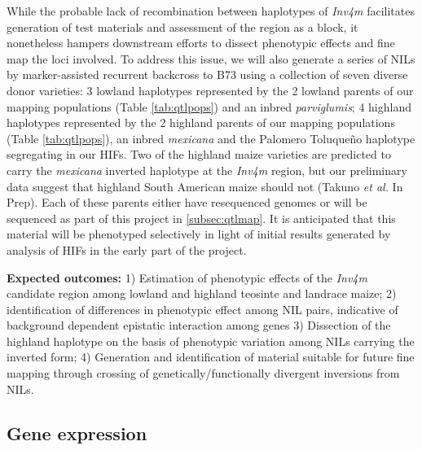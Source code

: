 While the probable lack of recombination between haplotypes of \emph{Inv4m} \citep{Pyhajarvi2013} facilitates generation of test materials and assessment of the region as a block, it nonetheless hampers downstream efforts to dissect phenotypic effects and fine map the loci involved. To address this issue, we will also generate a series of NILs by marker-assisted recurrent backcross to B73 using a collection of seven diverse donor varieties: 3 lowland haplotypes represented by the 2 lowland parents of our mapping populations (Table \ref{tab:qtlpops}) and an inbred \emph{parviglumis}; 4 highland haplotypes represented by the 2 highland parents of our mapping populations (Table \ref{tab:qtlpops}), an inbred \emph{mexicana} and the Palomero Toluque\~no haplotype segregating in our HIFs. Two of the highland maize varieties are predicted to carry the \emph{mexicana} inverted haplotype at the \emph{Inv4m} region, but our preliminary data suggest that highland South American maize should not (Takuno \emph{et al.} In Prep).  Each of these parents either have resequenced genomes \citep{Vielle-Calzada2009, Chia2012a} or will be sequenced as part of this project in \ref{subsec:qtlmap}. It is anticipated that this material will be phenotyped selectively in light of initial results generated by analysis of HIFs in the early part of the project.

{\bf Expected outcomes:} 1) Estimation of phenotypic effects of the \emph{Inv4m} candidate region among lowland and highland teosinte and landrace maize; 2) identification of differences in phenotypic effect among NIL pairs, indicative of background dependent epistatic interaction among genes 3) Dissection of the highland haplotype on the basis of phenotypic variation among NILs carrying the inverted form; 4) Generation and identification of material suitable for future fine mapping through crossing of genetically/functionally divergent inversions from NILs.   

\subsection{Gene expression} \label{subsec:rnaseq}

